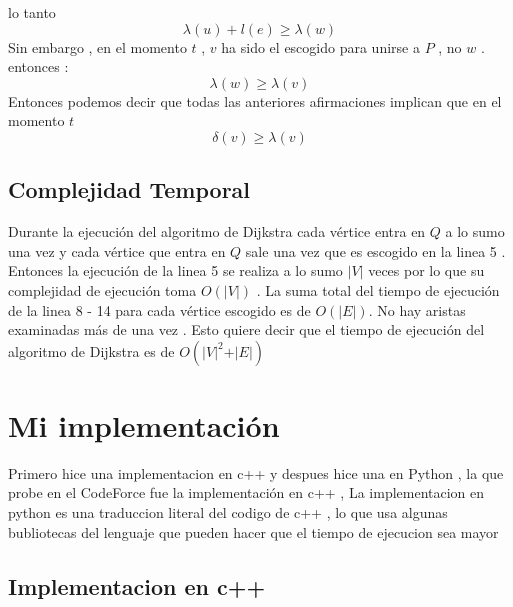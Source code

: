 \documentclass[10pt]{article}
\begin{document}
        lo tanto 
        \begin{equation*}
            \lambda\left(u\right) + l\left(e\right) \geq \lambda\left(w\right)
        \end{equation*} 
        Sin embargo , en el momento $t$ , $v$ ha sido el escogido para unirse a $P$ , no  $w$ . entonces : 
        \begin{equation*}
            \lambda\left(w\right) \geq \lambda\left(v\right)
        \end{equation*}
        Entonces podemos decir que todas las anteriores afirmaciones implican que en el momento $t$ 
        \begin{equation*}
            \delta\left(v\right) \geq \lambda\left(v\right)
        \end{equation*}

    \subsection{Complejidad Temporal }
        \noindent Durante la ejecuci\'on del algoritmo de Dijkstra cada v\'ertice entra en $Q$ a lo sumo una vez y cada v\'ertice que entra en $Q$ sale 
        una vez que es escogido en la linea 5 . Entonces la ejecuci\'on de la linea 5 se realiza a lo sumo $\vert V \vert$ veces por lo que su complejidad 
        de ejecuci\'on toma $O\left(\vert V \vert\right)$ . La suma total del tiempo de ejecuci\'on de la linea 8 - 14 para cada v\'ertice escogido es de $O\left(\vert E \vert\right)$. 
        No hay aristas examinadas m\'as de una vez . Esto quiere decir que el tiempo de ejecuci\'on del algoritmo de Dijkstra es de $O\left(\vert V \vert ^ 2 + \vert E \vert \right)$
        
    \section{Mi implementaci\'on }

    Primero hice una implementacion en c++ y despues hice una en Python , la que probe en el CodeForce fue la implementaci\'on en c++ , La implementacion en python es una traduccion literal del codigo de c++ , lo que usa algunas bubliotecas del lenguaje que pueden hacer que el tiempo de ejecucion sea mayor
    
    \subsection{Implementacion en c++ } 
\end{document}
